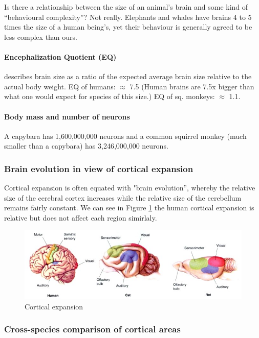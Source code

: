 \documentclass[12pt,article,oneside,a4paper]{memoir}
\begin{document}
Is there a relationship between the size of an animal's brain and some kind of “behavioural complexity”? Not really. Elephants and whales have brains 4 to 5 times the size of a human being's, yet their behaviour is generally agreed to be less complex than ours.

\paragraph{Encephalization Quotient (EQ)} describes brain size as a ratio of the expected average brain size relative to the actual body weight. EQ of humans: $\approx$ 7.5 (Human brains are 7.5x bigger than what one would expect for species of this size.) EQ of sq. monkeys: $\approx$ 1.1.

\paragraph{Body mass and number of neurons} A capybara has 1,600,000,000 neurons and a common squirrel monkey (much smaller than a capybara) has 3,246,000,000 neurons.

\subsubsection{Brain evolution in view of cortical expansion}
Cortical expansion is often equated with "brain evolution”, whereby the relative size of the cerebral cortex increases while the relative size of the cerebellum remains fairly constant. We can see in Figure \ref{fig:corticalExpansion} the human cortical expansion is relative but does not affect each region simirlaly.

\begin{figure}
	\centering
  	\includegraphics[width=\linewidth]{imgs/comparativeNeuroanatomy.jpg}
	\caption{Cortical expansion}
  	\label{fig:corticalExpansion}
\end{figure}

\subsubsection{Cross-species comparison of cortical areas}
\end{document}
